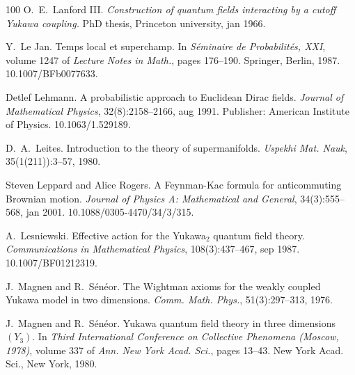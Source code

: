 \documentclass{article}
\newcommand{\tmrsub}[1]{\ensuremath{_{\textrm{#1}}}}
\newcommand{\tmtextit}[1]{{\itshape{#1}}}
\begin{document}
\begin{thebibliography}{100}
  O.~E.~Lanford III.
  {\newblock}\tmtextit{Construction of quantum fields interacting by a cutoff
  Yukawa coupling.} {\newblock}PhD thesis, Princeton university, jan
  1966.{\newblock}
  
  Y.~Le Jan. {\newblock}Temps local et
  superchamp. {\newblock}In \tmtextit{S{\'e}minaire de Probabilit{\'e}s, XXI},
  volume  1247  of \tmtextit{Lecture Notes in Math.},  pages  176--190.
  Springer, Berlin, 1987.
  {\newblock}\href{Https://doi.org/10.1007/BFb0077633}{}10.1007/BFb0077633.{\newblock}
  
  Detlef Lehmann. {\newblock}A
  probabilistic approach to Euclidean Dirac fields.
  {\newblock}\tmtextit{Journal of Mathematical Physics}, 32(8):2158--2166, aug
  1991. {\newblock}Publisher: American Institute of Physics.
  \href{https://doi.org/10.1063/1.529189}{}10.1063/1.529189.{\newblock}
  
  D.~A.~Leites. {\newblock}Introduction to the theory of
  supermanifolds. {\newblock}\tmtextit{Uspekhi Mat. Nauk}, 35(1(211)):3--57,
  1980.{\newblock}
  
  Steven Leppard  and  Alice Rogers.
  {\newblock}A Feynman-Kac formula for anticommuting Brownian motion.
  {\newblock}\tmtextit{Journal of Physics A: Mathematical and General},
  34(3):555--568, jan 2001.
  {\newblock}\href{Https://doi.org/10.1088/0305-4470/34/3/315}{}10.1088/0305-4470/34/3/315.{\newblock}
  
  A.~Lesniewski. {\newblock}Effective
  action for the Yukawa\tmrsub{$2$} quantum field theory.
  {\newblock}\tmtextit{Communications in Mathematical Physics},
  108(3):437--467, sep 1987.
  {\newblock}\href{Https://doi.org/10.1007/BF01212319}{}10.1007/BF01212319.{\newblock}
  
  J.~Magnen  and  R.~S{\'e}n{\'e}or. {\newblock}The
  Wightman axioms for the weakly coupled Yukawa model in two dimensions.
  {\newblock}\tmtextit{Comm. Math. Phys.}, 51(3):297--313, 1976.{\newblock}
  
  J.~Magnen  and  R.~S{\'e}n{\'e}or.
  {\newblock}Yukawa quantum field theory in three dimensions $(Y_3)$.
  {\newblock}In \tmtextit{Third International Conference on Collective
  Phenomena (Moscow, 1978)},  volume  337  of \tmtextit{Ann. New York Acad.
  Sci.},  pages  13--43. New York Acad. Sci., New York, 1980.{\newblock}
  

\end{thebibliography}
\end{document}
